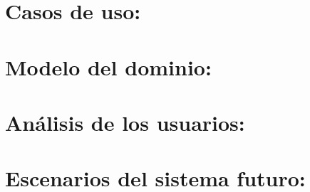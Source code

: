 \documentclass[10pt, a4paper,spanish]{article}
\begin{document}
	\section{Casos de uso:}

		\paragraph{}


	\section{Modelo del dominio:}

		\paragraph{}


	\section{Análisis de los usuarios:}

		\paragraph{}


	\section{Escenarios del sistema futuro:}

		\paragraph{}
\end{document}
